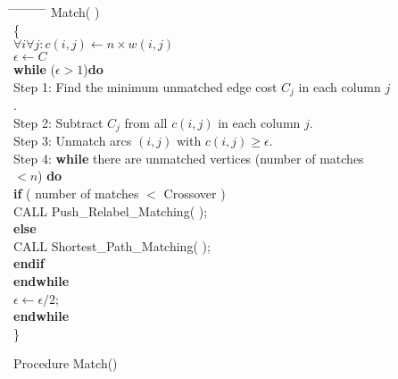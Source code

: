 \begin{figure}
\begin{tabbing}
\hspace*{.25in} \= \hspace*{.25in} \= \hspace*{.25in} \= \hspace*{.25in} \= \hspace*{.25in} \= \hspace*{.25in} \=  \hspace*{.25in} \= \hspace*{.25in} \= \hspace*{.25in} \= \kill
Match( ) \\ 
\{ \\
\> $\forall i \forall j : c(i, j) \leftarrow n \times w(i, j)$ \\
\> $\epsilon \leftarrow  C$ \\
\> {\bf while}  ($ \epsilon > 1$){\bf do } \\
\> \> Step 1: \> \> \> Find the minimum unmatched edge cost $C_j$ in each column $j$. \\
\> \> Step 2: \> \> \> Subtract $C_j$ from all $c(i, j)$ in each column $j$. \\
\> \> Step 3: \> \> \> Unmatch arcs $(i, j)$ with $c(i, j) \geq \epsilon$. \\
\> \> Step 4: \> \> \> {\bf while} there are unmatched vertices (number %
			of matches $< n$) {\bf do} \\
\> \> \> \> \> \> {\bf if} ( number of matches $<$ Crossover ) \\
\> \> \> \> \> \> \> CALL Push\_Relabel\_Matching( ); \\
\> \> \> \> \> \> {\bf else} \\
\> \> \> \> \> \> \> CALL Shortest\_Path\_Matching( ); \\
\> \> \> \> \> \> {\bf endif} \\
\> \> \> \> \> {\bf endwhile} \\
\> \> $\epsilon \leftarrow \epsilon/2$; \\
\> {\bf endwhile} \\
\} \\
\end{tabbing}
\caption{Procedure Match()}
\label{match_procedure}
\end{figure}

